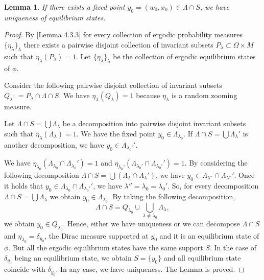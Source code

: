 \documentclass[12pt,a4paper]{amsart}
\theoremstyle{plain}
\newtheorem{lemma}{Lemma}
\begin{document}
	\begin{lemma}
		If there exists a fixed point $y_{0} = (w_{0}, x_{0}) \in \Lambda \cap S$, we have uniqueness of equilibrium states.
	\end{lemma}	
    \begin{proof}
     By \cite{OV}[Lemma 4.3.3] for every collection of ergodic probability measures $\{\eta_{\lambda}\}_{\lambda}$ there exists a pairwise disjoint collection of invariant subsets $P_{\lambda} \subset \Omega \times M$ such that $\eta_{\lambda}(P_{\lambda})= 1$. Let $\{\eta_{\lambda}\}_{\lambda}$ be the collection of ergodic equilibrium states of $\phi$. 
     
     Consider the following pairwise disjoint collection of invariant subsets $Q_{\lambda} : = P_{\lambda} \cap \Lambda \cap S$. We have $\eta_{\lambda}(Q_{\lambda}) = 1$ because $\eta_{\lambda}$ is a random zooming measure.
     
     Let $\Lambda\cap S = \bigcup \Lambda_{\lambda}$ be a decomposition into pairwise disjoint invariant subsets such that $\eta_{\lambda}(\Lambda_{\lambda}) = 1$. We have the fixed point $y_{0} \in \Lambda_{\lambda_{0}}$. If $\Lambda\cap S = \bigcup \Lambda_{\lambda}'$ is another decomposition, we have $y_{0} \in \Lambda_{\lambda_{0}'}'$.
     
     We have $\eta_{\lambda_{0}}(\Lambda_{\lambda_{0}} \cap \Lambda_{\lambda_{0}}') = 1$ and $\eta_{\lambda_{0}'}(\Lambda_{\lambda_{0}'} \cap \Lambda_{\lambda_{0}'}') = 1$. By considering the following decomposition $\Lambda\cap S = \bigcup (\Lambda_{\lambda} \cap \Lambda_{\lambda}')$, we have $y_{0} \in \Lambda_{\lambda''} \cap \Lambda_{\lambda''}'$. Once it holds that $y_{0} \in \Lambda_{\lambda_{0}} \cap \Lambda_{\lambda_{0}'}'$, we have $\lambda'' = \lambda_{0} = \lambda_{0}'$. So, for every decomposition $\Lambda\cap S = \bigcup \Lambda_{\lambda}$ we obtain $y_{0} \in  \Lambda_{\lambda_{0}}$. By taking the following decomposition,
     \[
     \Lambda\cap S = Q_{\lambda_{0}} \cup \bigcup_{\lambda \neq \lambda_{0}} \Lambda_{\lambda},
     \]
     we obtain $y_{0} \in Q_{\lambda_{0}}$. Hence, either we have uniqueness or we can decompose $\Lambda \cap S$ and  $\eta_{\lambda_{0}} = \delta_{y_{0}}$, the Dirac measure supported at $y_{0}$ and it is an equilibrium state of $\phi$. But all the ergodic equilibrium states have the same support $S$. In the case of $\delta_{y_{0}}$ being an equilibrium state, we obtain $S = \{y_{0}\}$ and all equilibrium state coincide with $\delta_{y_{0}}$. In any case, we have uniqueness. The Lemma is proved.
    \end{proof}
	 
\end{document}
